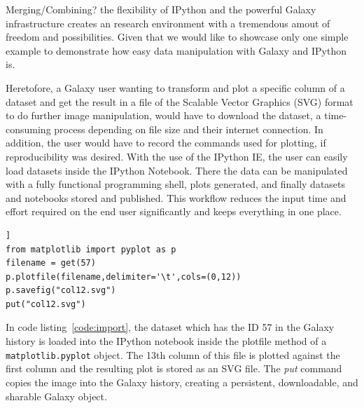 \documentclass{bioinfo}
\begin{document}
\begin{methods}
Merging/Combining? the flexibility of IPython and the powerful Galaxy infrastructure creates an research environment
with a tremendous amout of freedom and possibilities. Given that we would like to showcase only one simple
example to demonstrate how easy data manipulation with Galaxy and IPython is. 

Heretofore, a Galaxy user wanting to transform and plot a specific column of a dataset and
get the result in a file of the Scalable Vector Graphics (SVG) format to do further image manipulation,
would have to download the dataset, a time-consuming process depending on file size and their internet
connection. In addition, the user would have to record the commands used for plotting, if reproducibility was desired.
With the use of the IPython IE, the user can easily load datasets inside the IPython Notebook.
There the data can be manipulated with a fully functional programming shell, plots generated,
and finally datasets and notebooks stored and published.
This workflow reduces the input time and effort required on the end user significantly and keeps everything in one place.

\begin{lstlisting}[frame=single,caption={Plotting example},label=code:import]]
from matplotlib import pyplot as p
filename = get(57)
p.plotfile(filename,delimiter='\t',cols=(0,12))
p.savefig("col12.svg")
put("col12.svg")
\end{lstlisting}

In code listing~\ref{code:import}, the dataset which has the ID 57 in the Galaxy history is loaded 
into the IPython notebook inside the plotfile method of a \texttt{matplotlib.pyplot} object. 
The 13th column of this file is plotted against the first column and the
resulting plot is stored as an SVG file. The \textit{put} command copies the image into the Galaxy history, 
creating a persistent, downloadable, and sharable Galaxy object.


%
%
%
%
%
%
%
%
%
%


\end{methods}
\end{document}
